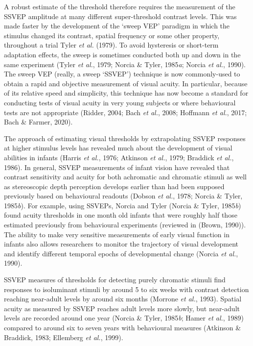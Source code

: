 \documentclass[
  letterpaper,
  DIV=11,
  numbers=noendperiod]{scrartcl}
\begin{document}
A robust estimate of the threshold therefore requires the measurement of
the SSVEP amplitude at many different super-threshold contrast levels.
This was made faster by the development of the `sweep VEP' paradigm in
which the stimulus changed its contrast, spatial frequency or some other
property, throughout a trial Tyler \emph{et al.} (1979). To avoid
hysteresis or short-term adaptation effects, the sweep is sometimes
conducted both up and down in the same experiment (Tyler \emph{et al.},
1979; Norcia \& Tyler, 1985\emph{a}; Norcia \emph{et al.}, 1990). The
sweep VEP (really, a sweep `SSVEP') technique is now commonly-used to
obtain a rapid and objective measurement of visual acuity. In
particular, because of its relative speed and simplicity, this technique
has now become a standard for conducting tests of visual acuity in very
young subjects or where behavioural tests are not appropriate (Ridder,
2004; Bach \emph{et al.}, 2008; Hoffmann \emph{et al.}, 2017; Bach \&
Farmer, 2020).

The approach of estimating visual thresholds by extrapolating SSVEP
responses at higher stimulus levels has revealed much about the
development of visual abilities in infants (Harris \emph{et al.}, 1976;
Atkinson \emph{et al.}, 1979; Braddick \emph{et al.}, 1986). In general,
SSVEP measurements of infant vision have revealed that contrast
sensitivity and acuity for both achromatic and chromatic stimuli as well
as stereoscopic depth perception develops earlier than had been supposed
previously based on behavioural readouts (Dobson \emph{et al.}, 1978;
Norcia \& Tyler, 1985\emph{b}). For example, using SSVEPs, Norcia and
Tyler (Norcia \& Tyler, 1985\emph{b}) found acuity thresholds in one
month old infants that were roughly half those estimated previously from
behavioural experiments (reviewed in (Brown, 1990)). The ability to make
very sensitive measurements of early visual function in infants also
allows researchers to monitor the trajectory of visual development and
identify different temporal epochs of developmental change (Norcia
\emph{et al.}, 1990).

SSVEP measures of thresholds for detecting purely chromatic stimuli find
responses to isoluminant stimuli by around 5 to six weeks with contrast
detection reaching near-adult levels by around six months (Morrone
\emph{et al.}, 1993). Spatial acuity as measured by SSVEP reaches adult
levels more slowly, but near-adult levels are recorded around one year
(Norcia \& Tyler, 1985\emph{b}; Hamer \emph{et al.}, 1989) compared to
around six to seven years with behavioural measures (Atkinson \&
Braddick, 1983; Ellemberg \emph{et al.}, 1999).
\end{document}
